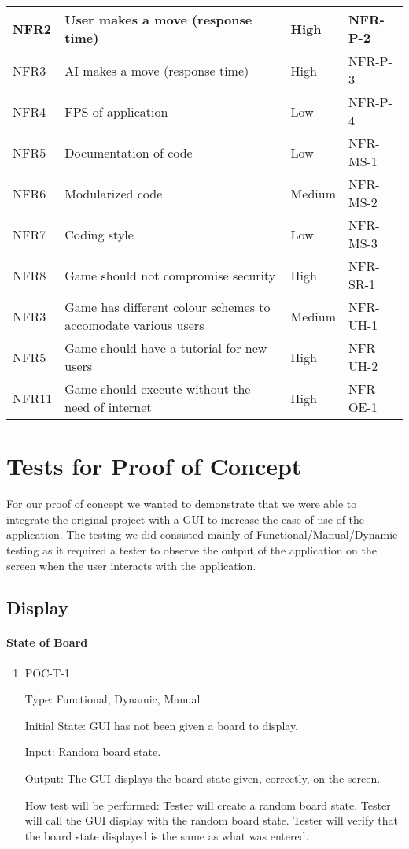 \documentclass[12pt, titlepage]{article}
\begin{document}
\begin{table}[htbp]
\begin{center}
\begin{adjustwidth}{-1.5cm}{}
\begin{tabularx}{1.2\textwidth}{|p{3.4cm}|p{7cm}|p{1.6cm}|X|}
		\hline
		NFR2 & User makes a move (response time) & High & NFR-P-2 \\
		\hline
		NFR3 & AI makes a move (response time) & High & NFR-P-3 \\
		\hline
		NFR4 & FPS of application & Low & NFR-P-4 \\
		\hline
		NFR5 & Documentation of code & Low & NFR-MS-1 \\
		\hline
		NFR6 & Modularized code & Medium & NFR-MS-2 \\
		\hline
		NFR7 & Coding style & Low & NFR-MS-3 \\
		\hline
		NFR8 & Game should not compromise security & High & NFR-SR-1 \\
		\hline
		NFR3 & Game has different colour schemes to accomodate various users & Medium & NFR-UH-1\\
		\hline
		NFR5 & Game should have a tutorial for new users & High & NFR-UH-2\\
		\hline
		NFR11 & Game should execute without the need of internet & High & NFR-OE-1\\
		\hline
	\end{tabularx}
	\end{adjustwidth}
	\end{center}
\end{table}

\newpage
\newpage

\section{Tests for Proof of Concept}
For our proof of concept we wanted to demonstrate that we were able to integrate the original project with a GUI to increase the ease of use of the application. The testing we did consisted mainly of Functional/Manual/Dynamic testing as it required a tester to observe the output of the application on the screen when the user interacts with the application.

\subsection{Display}
		
\paragraph{State of Board}
\begin{enumerate}
\item{POC-T-1}

Type: Functional, Dynamic, Manual

Initial State: GUI has not been given a board to display.
					
Input: Random board state.
					
Output: The GUI displays the board state given, correctly, on the screen.
					
How test will be performed: Tester will create a random board state. Tester will call the GUI display with the random board state. Tester will verify that the board state displayed is the same as what was entered.
\end{enumerate}
\end{document}
